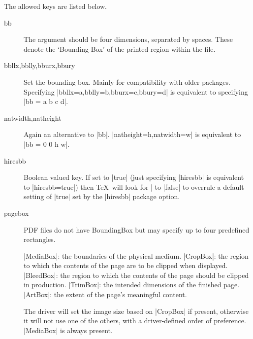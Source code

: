 The allowed keys are listed below.
\begin{description}
\item[bb] The argument should be four dimensions, separated by spaces.
  These denote the `Bounding Box' of the printed region within
  the file.
\item[bbllx,bblly,bburx,bbury] Set the bounding box. Mainly for
 compatibility with older packages.
 Specifying |bbllx=a,bblly=b,bburx=c,bbury=d|
 is equivalent to specifying |bb = a b c d|.
\item[natwidth,natheight] Again an alternative to |bb|. 
 |natheight=h,natwidth=w| is equivalent to |bb = 0 0 h w|.
\item[hiresbb]
 Boolean valued key. If set to |true| (just specifying |hiresbb|
 is equivalent to |hiresbb=true|) then \TeX\ will look for
 |%
 to |false| to overrule a default setting of |true| set by the
 |hiresbb| package option.
\item[pagebox]
PDF files do not have BoundingBox but may specify up to four predefined
rectangles.

|MediaBox|: the boundaries of the physical medium.
|CropBox|: the region to which the contents of the page are to be
  clipped when displayed.
|BleedBox|: the region to which the contents of the
 page should be clipped in production.
|TrimBox|: the intended dimensions of the finished page.
|ArtBox|: the extent of the page's meaningful content.

The driver will set the image size based on |CropBox| if present,
otherwise it will not use one of the others,
with a driver-defined order of preference.
|MediaBox| is always present.


\end{description}
